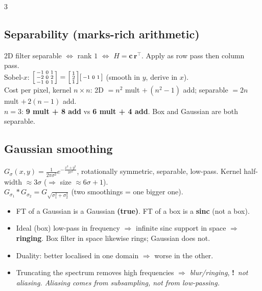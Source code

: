 \documentclass[9pt,a4paper,landscape]{extarticle}
\newcommand{\key}[1]{\textbf{#1}}
\newcommand{\tr}[1]{{\color{trap}\textbf{!}}\ \textit{#1}}
\begin{document}
\begin{multicols}{3}
\subsection{Separability (marks-rich arithmetic)}
2D filter separable $\iff$ rank $1$ $\iff$ $H=\mathbf{c}\,\mathbf{r}^{\top}$. Apply as row pass then column pass.\\
Sobel-$x$: $\begin{bsmallmatrix}-1&0&1\\-2&0&2\\-1&0&1\end{bsmallmatrix}=\begin{bsmallmatrix}1\\2\\1\end{bsmallmatrix}\begin{bsmallmatrix}-1&0&1\end{bsmallmatrix}$ (smooth in $y$, derive in $x$).\\
Cost per pixel, kernel $n\times n$: 2D $=n^2$ mult $+\,(n^2-1)$ add; separable $=2n$ mult $+\,2(n-1)$ add.\\
$n=3$: \key{9 mult + 8 add} vs \key{6 mult + 4 add}. Box and Gaussian are both separable.

\subsection{Gaussian smoothing}
$G_\sigma(x,y)=\frac{1}{2\pi\sigma^2}e^{-\frac{x^2+y^2}{2\sigma^2}}$, rotationally symmetric, separable, low-pass. Kernel half-width $\approx 3\sigma$ ($\Rightarrow$ size $\approx 6\sigma+1$).\\
$G_{\sigma_1}*G_{\sigma_2}=G_{\sqrt{\sigma_1^2+\sigma_2^2}}$ (two smoothings = one bigger one).
\begin{itemize}
\item FT of a Gaussian is a Gaussian \key{(true)}. FT of a box is a \key{sinc} (not a box).
\item Ideal (box) low-pass in frequency $\Rightarrow$ infinite sinc support in space $\Rightarrow$ \key{ringing}. Box filter in space likewise rings; Gaussian does not.
\item Duality: better localised in one domain $\Rightarrow$ worse in the other.
\item Truncating the spectrum removes high frequencies $\Rightarrow$ \emph{blur/ringing}, \tr{not aliasing. Aliasing comes from \emph{subsampling}, not from low-passing.}
\end{itemize}


\end{multicols}
\end{document}
